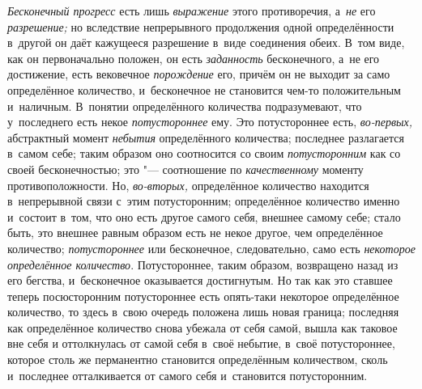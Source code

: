 {\em Бесконечный прогресс} есть лишь {\em выражение} этого противоречия,
а~{\em не} его {\em разрешение;} но вследствие непрерывного продолжения одной
определённости в~другой он даёт кажущееся разрешение в~виде соединения обеих. В~том
виде, как он первоначально положен, он есть {\em заданность}
бесконечного, а~не его достижение, есть вековечное {\em порождение} его, причём
он не выходит за само определённое количество, и~бесконечное не становится
чем-то положительным и~наличным. В~понятии определённого количества
подразумевают, что у~последнего есть некое {\em потустороннее} ему. Это
потустороннее есть, {\em во-первых,} абстрактный момент {\em небытия}
определённого количества; последнее разлагается в~самом себе; таким образом оно
соотносится со своим {\em потусторонним} как со своей бесконечностью; это "---
соотношение по {\em качественному} моменту противоположности. Но,
{\em во-вторых,} определённое количество находится в~непрерывной связи с~этим
потусторонним; определённое количество именно и~состоит в~том, что оно есть
другое самого себя, внешнее самому себе; стало быть, это внешнее равным образом
есть не некое другое, чем определённое количество; {\em потустороннее} или
бесконечное, следовательно, само есть {\em некоторое определённое количество}.
Потустороннее, таким образом, возвращено назад из его бегства, и~бесконечное
оказывается достигнутым. Но так как это ставшее теперь посюсторонним
потустороннее есть опять-таки некоторое определённое количество, то здесь
в~свою очередь положена лишь новая граница; последняя как определённое
количество снова убежала от себя самой, вышла как таковое вне себя и
оттолкнулась от самой себя в~своё небытие, в~своё потустороннее, которое столь
же перманентно становится определённым количеством, сколь и~последнее
отталкивается от самого себя и~становится потусторонним.

